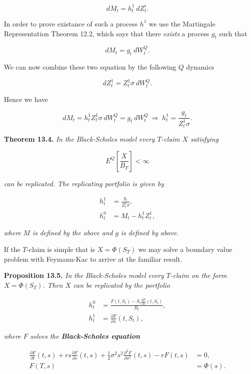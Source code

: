 \documentclass[
]{article}
\begin{document}
\[
dM_t=h_t^1\ dZ_t^i.\tag{13.10}
\]

In order to prove existance of such a process \(h^1\) we use the
Martingale Representation Theorem 12.2, which says that there
\emph{exists} a process \(g_t\) such that

\[
dM_t=g_t\ dW_t^Q.\tag{13.11}
\]

We can now combine these two equation by the following \(Q\) dynamics

\[
dZ_t^1=Z_t^1\sigma\ dW_t^Q.\tag{13.12}
\]

Hence we have

\[
dM_t=h_t^1Z_t^1\sigma\ dW_t^Q=g_t\ dW_t^Q\ \Rightarrow\ h_t^1=\frac{g_t}{Z_t^1\sigma}.
\]

\textbf{Theorem 13.4.} \emph{In the Black-Scholes model every
\(T\)-claim \(X\) satisfying}

\[
E^Q\left[\frac{X}{B_T}\right]<\infty
\]

\emph{can be replicated. The replicating portfolio is given by}

\begin{align*}
h_t^1&=\frac{g_t}{Z_t^1\sigma},\tag{13.13}\\
h_t^0&=M_t-h_t^1Z_t^1,\tag{13.14}
\end{align*}

\emph{where \(M\) is defined by the above and \(g\) is defined by
above.}

If the \(T\)-claim is simple that is \(X=\Phi(S_T)\) we may solve a
boundary value problem with Feymann-Kac to arrive at the familiar
result.

\textbf{Proposition 13.5.} \emph{In the Black-Scholes model every
\(T\)-claim on the form \(X=\Phi(S_T)\). Then \(X\) can be replicated by
the portfolio}

\begin{align*}
h_t^0&=\frac{F(t,S_t)-S_t\frac{\partial F}{\partial s}(t,S_t)}{B_t},\tag{13.15}\\
h_t^1&=\frac{\partial F}{\partial s}(t,S_t),\tag{13.15}
\end{align*}

\emph{where \(F\) solves the \textbf{Black-Scholes equation}}

\begin{align*}
\frac{\partial F}{\partial t}(t,s)+rs\frac{\partial F}{\partial s}(t,s)+\frac{1}{2}\sigma^2s^2 \frac{\partial^2 F}{\partial s^2}(t,s)-rF(t,s)&=0,\tag{13.16}\\
F(T,s)&=\Phi(s).\tag{13.16}
\end{align*}
\end{document}
